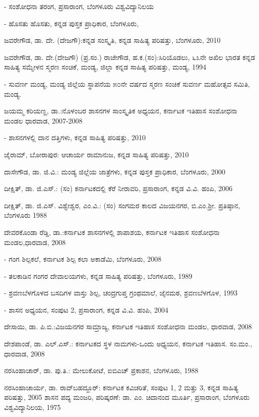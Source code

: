 - ಸಂಶೋಧನಾ ತರಂಗ, ಪ್ರಸಾರಾಂಗ, ಬೆಂಗಳೂರು ವಿಶ್ವವಿದ್ಯಾನಿಲಯ

- ಹೊಸತು ಹೊಸತು, ಕನ್ನಡ ಪುಸ್ತಕ ಪ್ರಾಧಿಕಾರ, ಬೆಂಗಳೂರು,

\noindent
ಜವರೇಗೌಡ, ಡಾ. ದೇ. (ದೇಜಗೌ):ಕನ್ನಡ ಸಂಸ್ಕೃತಿ, ಕನ್ನಡ ಸಾಹಿತ್ಯ ಪರಿಷತ್ತು, ಬೆಂಗಳೂರು, 2010

\noindent
ಜವರೇಗೌಡ, ಡಾ. ದೇ.(ದೇಜಗೌ) (ಪ್ರ.ಸಂ.) ರಾಜೇಗೌಡ, ಹ.ಕ.(ಸಂ):ಸಿರಿಯೊಡಲು, ೬೩ನೇ ಅಖಿಲ ಭಾರತ ಕನ್ನಡ ಸಾಹಿತ್ಯ ಸಮ್ಮೇಳನ ಸ್ಮರಣ ಸಂಚಿಕೆ, ಮಂಡ್ಯ, ಜಿಲ್ಲಾ ಕನ್ನಡ ಸಾಹಿತ್ಯ ಪರಿಷತ್ತು, ಮಂಡ್ಯ, 1994

- ಸುವರ್ಣ ಮಂಡ್ಯ, ಮಂಡ್ಯ ಜಿಲ್ಲೆಯ ಸ್ಥಾಪನೆಯ ೫೦ನೇ ವರ್ಷದ ಸ್ಮರಣ ಸಂಚಿಕೆ ಸುವರ್ಣ ಮಹೋತ್ಸವ ಸಮಿತಿ, ಮಂಡ್ಯ.

\noindent
ಜಯಮ್ಮ ಕರಿಯಣ್ಣ, ಡಾ.:ನೊಳಂಬರ ಶಾಸನಗಳ ಸಾಂಸ್ಕೃತಿಕ ಅಧ್ಯಯನ, ಕರ್ನಾಟಕ ಇತಿಹಾಸ ಸಂಶೋಧನಾ ಮಂಡಲ ಧಾರವಾಡ, 2007-2008

- ಶಾಸನಗಳಲ್ಲಿ ದಾನ ದತ್ತಿಗಳು, ಕನ್ನಡ ಸಾಹಿತ್ಯ ಪರಿಷತ್ತು, 2010

\noindent
ಜೈರಾಮ್, ಬೋರಾಪುರ: ಆಚಾರ್ಯ ರಾಮಾನುಜ, ಕನ್ನಡ ಸಾಹಿತ್ಯ ಪರಿಷತ್ತು, 2010

\noindent
ದಾಸೇಗೌಡ, ಡಾ. ಜಿ.ವಿ.: ಮಂಡ್ಯ ಜಿಲ್ಲೆಯ ಜಾತ್ರೆಗಳು, ಕನ್ನಡ ಪುಸ್ತಕ ಪ್ರಾಧಿಕಾರ, ಬೆಂಗಳೂರು, 2000

\noindent
ದೀಕ್ಷಿತ್​, ಡಾ. ಜಿ.ಎಸ್​.: (ಸಂ) ಕರ್ನಾಟಕದಲ್ಲಿ ಕೆರೆ ನೀರಾವರಿ, ಪ್ರಸಾರಾಂಗ, ಕನ್ನಡ ವಿ.ವಿ. ಹಂಪಿ, 2006

\noindent
ದೀಕ್ಷಿತ್​, ಡಾ. ಜಿ.ಎಸ್​. ವಿಶ್ವೇಶ್ವರ, ಎಂ.ವಿ.: (ಸಂ) ಸಂಗಮರ ಕಾಲದ ವಿಜಯನಗರ, ಬಿ.ಎಂ.ಶ‍್ರೀ. ಪ್ರತಿಷ್ಠಾನ, ಬೆಂಗಳೂರು 1988

\noindent
ದೇವರಕೊಂಡಾ ರೆಡ್ಡಿ, ಡಾ.:ಕರ್ನಾಟಕ ಶಾಸನಗಳಲ್ಲಿ ಶಾಪಾಶಯ, ಕರ್ನಾಟಕ ಇತಿಹಾಸ ಸಂಶೋಧನಾ ಮಂಡಲ,ಧಾರವಾಡ, 2008

- ಗಂಗ ಶಿಲ್ಪಕಲೆ, ಕರ್ನಾಟಕ ಶಿಲ್ಪ ಕಲಾ ಅಕಾಡೆಮಿ, ಬೆಂಗಳೂರು, 2008

- ತಲಕಾಡಿನ ಗಂಗರ ದೇವಾಲಯಗಳು, ಕನ್ನಡ ಸಾಹಿತ್ಯ ಪರಿಷತ್ತು, ಬೆಂಗಳೂರು, 1989

- ಶ್ರವಣಬೆಳಗೊಳದ ಬಸದಿಗಳ ವಾಸ್ತು ಶಿಲ್ಪ, ಚಂದ್ರಗುಪ್ತ ಗ್ರಂಥಮಾಲೆ, ಜೈನಮಠ, ಶ್ರವಣಬೆಳಗೊಳ, 1993

- ಶಾಸನ ಅಧ್ಯಯನ, ಸಂಪುಟ 2, ಪ್ರಸಾರಾಂಗ, ಕನ್ನಡ ವಿ.ವಿ. ಹಂಪಿ, 2004

\noindent
ದೇಸಾಯಿ, ಡಾ. ಪಿ.ಬಿ.:ವಿಜಯನಗರ ಸಾಮ್ರಾಜ್ಯ, ಕರ್ನಾಟಕ ಇತಿಹಾಸ ಸಂಶೋಧನಾ ಮಂಡಲ, ಧಾರವಾಡ, 2008

\noindent
ದೇಶಪಾಂಡೆ, ಡಾ. ಎಲ್​.ಎಸ್​.: ಕರ್ನಾಟಕದ ಸ್ಥಳ ನಾಮಗಳು-ಒಂದು ಅಧ್ಯಯನ, ಕರ್ನಾಟಕ ಇತಿಹಾಸ. ಸಂ.ಮಂ., ಧಾರವಾಡ, 2008

\noindent
ನರಸಿಂಹಾಚಾರ್​, ಡಾ. ಪು.ತಿ.: ಮೇಲುಕೋಟೆ, ಐಬಿಎಚ್​ ಪ್ರಕಾಶನ, ಬೆಂಗಳೂರು, 1988

\noindent
ನರಸಿಂಹಾಚಾರ್ಯ, ಡಾ. ರಾವ್​ಬಹದ್ದೂರ್​: ಕರ್ನಾಟಕ ಕವಿಚರಿತೆ, ಸಂಪುಟ 1, 2 ಮತ್ತು 3, ಕನ್ನಡ ಸಾಹಿತ್ಯ ಪರಿಷತ್ತು, 2005 ಶಾಸನ ಪದ್ಯ ಮಂಜರಿ, ಪರಿಷ್ಕರಣೆ: ಡಾ. ಎಂ. ಚಿದಾನಂದ ಮೂರ್ತಿ, ಪ್ರಸಾರಾಂಗ, ಬೆಂಗಳೂರು ವಿಶ್ವವಿದ್ಯಾನಿಲಯ, 1975

